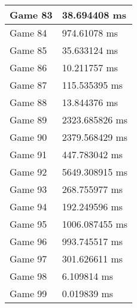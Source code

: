 \begin{tabular}{|l|l|}
	Game 83 & 38.694408 ms \\ \hline
	Game 84 & 974.61078 ms \\ \hline
	Game 85 & 35.633124 ms \\ \hline
	Game 86 & 10.211757 ms \\ \hline
	Game 87 & 115.535395 ms \\ \hline
	Game 88 & 13.844376 ms \\ \hline
	Game 89 & 2323.685826 ms \\ \hline
	Game 90 & 2379.568429 ms \\ \hline
	Game 91 & 447.783042 ms \\ \hline
	Game 92 & 5649.308915 ms \\ \hline
	Game 93 & 268.755977 ms \\ \hline
	Game 94 & 192.249596 ms \\ \hline
	Game 95 & 1006.087455 ms \\ \hline
	Game 96 & 993.745517 ms \\ \hline
	Game 97 & 301.626611 ms \\ \hline
	Game 98 & 6.109814 ms \\ \hline
	Game 99 & 0.019839 ms \\ \hline
\end{tabular}